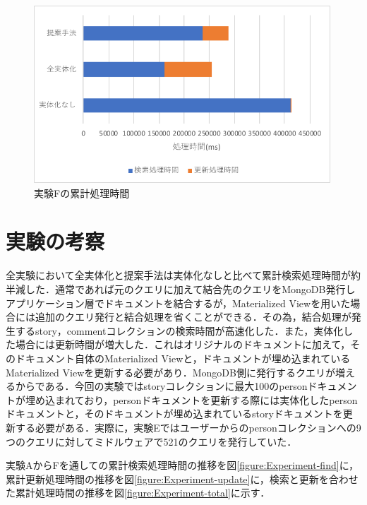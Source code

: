 \documentclass[a4paper,11pt]{ujreport}
\begin{document}
\begin{figure}[htbp]
	\begin{center}
		\includegraphics[width=30em]{src/ExperimentF-total.pdf} %
	\end{center}
	\caption{実験Fの累計処理時間}
	\label{figure:ExperimentF-total}
\end{figure}

\section{実験の考察}
\label{sec:Consideration}

全実験において全実体化と提案手法は実体化なしと比べて累計検索処理時間が約半減した．通常であれば元のクエリに加えて結合先のクエリをMongoDB発行しアプリケーション層でドキュメントを結合するが，Materialized Viewを用いた場合には追加のクエリ発行と結合処理を省くことができる．その為，結合処理が発生するstory，commentコレクションの検索時間が高速化した．また，実体化した場合には更新時間が増大した．これはオリジナルのドキュメントに加えて，そのドキュメント自体のMaterialized Viewと，ドキュメントが埋め込まれているMaterialized Viewを更新する必要があり．MongoDB側に発行するクエリが増えるからである．今回の実験ではstoryコレクションに最大100のpersonドキュメントが埋め込まれており，personドキュメントを更新する際には実体化したpersonドキュメントと，そのドキュメントが埋め込まれているstoryドキュメントを更新する必要がある．実際に，実験Eではユーザーからのpersonコレクションへの9つのクエリに対してミドルウェアで521のクエリを発行していた．

実験AからFを通しての累計検索処理時間の推移を図\ref{figure:Experiment-find}に，累計更新処理時間の推移を図\ref{figure:Experiment-update}に，検索と更新を合わせた累計処理時間の推移を図\ref{figure:Experiment-total}に示す．
\end{document}
